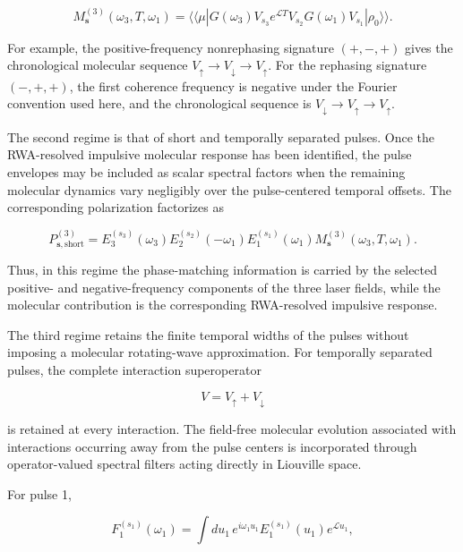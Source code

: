 \documentclass[11pt]{article}
\begin{document}
\begin{equation}
\boxed{
M_{\mathbf{s}}^{(3)}
(\omega_3,T,\omega_1)
=
\langle\!\langle\mu|
G(\omega_3)
V_{s_3}
e^{\mathcal{L}T}
V_{s_2}
G(\omega_1)
V_{s_1}
|\rho_0\rangle\rangle .
}
\end{equation}

For example, the positive-frequency nonrephasing signature
$(+,-,+)$ gives the chronological molecular sequence
$V_{\uparrow}\rightarrow V_{\downarrow}\rightarrow V_{\uparrow}$.
For the rephasing signature $(-,+,+)$, the first coherence frequency
is negative under the Fourier convention used here, and the
chronological sequence is
$V_{\downarrow}\rightarrow V_{\uparrow}\rightarrow V_{\uparrow}$.

The second regime is that of short and temporally separated pulses.
Once the RWA-resolved impulsive molecular response has been identified,
the pulse envelopes may be included as scalar spectral factors when
the remaining molecular dynamics vary negligibly over the
pulse-centered temporal offsets. The corresponding polarization
factorizes as

\begin{equation}
\boxed{
P_{\mathbf{s},\mathrm{short}}^{(3)}
=
E_3^{(s_3)}(\omega_3)
E_2^{(s_2)}(-\omega_1)
E_1^{(s_1)}(\omega_1)
M_{\mathbf{s}}^{(3)}
(\omega_3,T,\omega_1).
}
\end{equation}

Thus, in this regime the phase-matching information is carried by the
selected positive- and negative-frequency components of the three
laser fields, while the molecular contribution is the corresponding
RWA-resolved impulsive response.

The third regime retains the finite temporal widths of the pulses
without imposing a molecular rotating-wave approximation. For
temporally separated pulses, the complete interaction superoperator

\begin{equation}
V
=
V_{\uparrow}+V_{\downarrow}
\end{equation}

is retained at every interaction. The field-free molecular evolution
associated with interactions occurring away from the pulse centers is
incorporated through operator-valued spectral filters acting directly
in Liouville space.

For pulse 1,

\begin{equation}
F_1^{(s_1)}(\omega_1)
=
\int du_1\,
e^{i\omega_1u_1}
E_1^{(s_1)}(u_1)
e^{\mathcal{L}u_1},
\end{equation}
\end{document}
